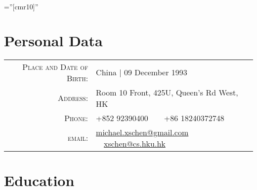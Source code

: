 \documentclass[a4paper,8pt]{article} %
\begin{document}
\pagestyle{empty} %

\font\fb=''[cmr10]'' %


\par{\bigskip\par} %

\section{Personal Data}

\begin{tabular}{rl}
\textsc{Place and Date of Birth:} & China  | 09 December 1993 \\
\textsc{Address:} & Room 10 Front, 425U, Queen's Rd West, HK \\
\textsc{Phone:} & +852 92390400\ \ \ \ +86 18240372748 \\
\textsc{email:} & \href{mailto:michael.xschen@gmail.com}{michael.xschen@gmail.com} \ \ \href {xschen@cs.hku.hk}{xschen@cs.hku.hk}
\end{tabular}




\section{Education}
\end{document}
